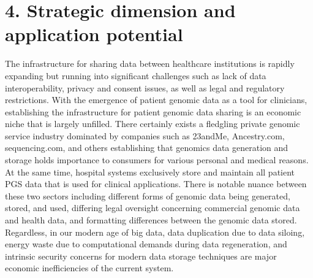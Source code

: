 \documentclass[a4paper,11pt]{article}
\begin{document}
\section{4. Strategic dimension and application potential}
\begin{comment}
Elaborate the strategic dimension of your research, with regard to the (long-term) potential for innovative applications. 
Substantiate the PhD project’s strategic focus on economically relevant innovations. Justify how the chosen research approach (if successful) is the appropriate one to achieve the anticipated application(s) (potentially long term).
Elaborate the strategic importance of the potential applications to possible users (impact). Show how (if the project is successful) new products, services and/or processes may affect business of specific companies, a collective of companies and/or a sector and/or may be closely aligned with the Flemish science, technology and innovation transition priorities  (Flanders in transition. Priorities in Science, Technology and Innovation towards 2025) (socio-economic benefits). Societal impact should always be linked to a (in)direct (macro)economic benefit, e.g. cost reductions in health care, higher education level, environmental impact etc. should be positioned in an economic context.
\end{comment}

The infrastructure for sharing data between healthcare institutions is rapidly expanding but running into significant challenges such as lack of data interoperability, privacy and consent issues, as well as legal and regulatory restrictions. 
With the emergence of patient genomic data as a tool for clinicians, establishing the infrastructure for patient genomic data sharing is an economic niche that is largely unfilled. 
There certainly exists a fledgling private genomic service industry dominated by companies such as 23andMe, Ancestry.com, sequencing.com, and others establishing that genomics data generation and storage holds importance to consumers for various personal and medical reasons. 
At the same time, hospital systems exclusively store and maintain all patient PGS data that is used for clinical applications. 
There is notable nuance between these two sectors including different forms of genomic data being generated, stored, and used, differing legal oversight concerning commercial genomic data and health data, and formatting differences between the genomic data stored. 
Regardless, in our modern age of big data, data duplication due to data siloing, energy waste due to computational demands during data regeneration, and intrinsic security concerns for modern data storage techniques are major economic inefficiencies of the current system. 
\end{document}

